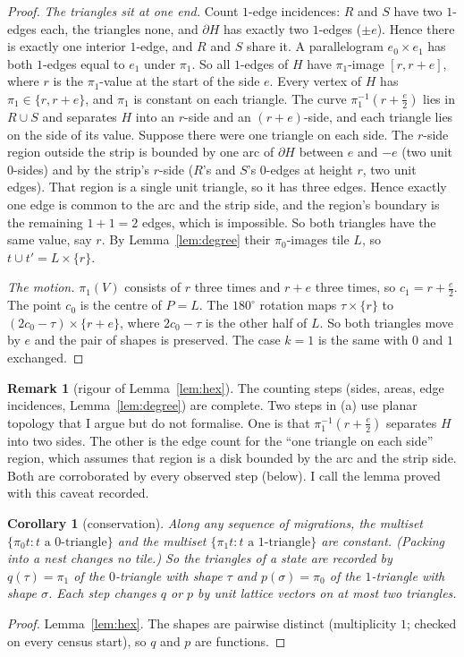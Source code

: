 \documentclass[11pt]{article}
\newtheorem{corollary}[theorem]{Corollary}
\theoremstyle{definition}
\newtheorem{remark}[theorem]{Remark}
\begin{document}
\begin{proof}
\emph{The triangles sit at one end.} Count $1$-edge incidences: $R$ and $S$ have two $1$-edges each, the triangles none, and $\partial H$ has
exactly two $1$-edges ($\pm e$). Hence there is exactly one interior $1$-edge, and $R$ and $S$ share it. A parallelogram $e_0\times e_1$ has both
$1$-edges equal to $e_1$ under $\pi_1$. So all $1$-edges of $H$ have $\pi_1$-image $[r,r+e]$, where $r$ is the $\pi_1$-value at the start of the
side $e$. Every vertex of $H$ has $\pi_1\in\{r,r+e\}$, and $\pi_1$ is constant on each triangle. The curve $\pi_1^{-1}(r+\frac e2)$ lies in
$R\cup S$ and separates $H$ into an $r$-side and an $(r+e)$-side, and each triangle lies on the side of its value. Suppose there were one triangle on
each side. The $r$-side region outside the strip is bounded by one arc of $\partial H$ between $e$ and $-e$ (two unit $0$-sides) and by the
strip's $r$-side ($R$'s and $S$'s $0$-edges at height $r$, two unit edges). That region is a single unit triangle, so it has three edges. Hence
exactly one edge is common to the arc and the strip side, and the region's boundary is the remaining $1+1=2$ edges, which is impossible.
So both triangles have the same value, say $r$. By Lemma~\ref{lem:degree} their $\pi_0$-images tile $L$, so $t\cup t'=L\times\{r\}$.

\emph{The motion.} $\pi_1(V)$ consists of $r$ three times and $r+e$ three times, so $c_1=r+\frac e2$. The point $c_0$ is the centre of $P=L$. The
$180^\circ$ rotation maps $\tau\times\{r\}$ to $(2c_0-\tau)\times\{r+e\}$, where $2c_0-\tau$ is the other half of $L$. So both triangles
move by $e$ and the pair of shapes is preserved. The case $k=1$ is the same with $0$ and $1$ exchanged.
\end{proof}

\begin{remark}[rigour of Lemma~\ref{lem:hex}]
The counting steps (sides, areas, edge incidences, Lemma~\ref{lem:degree}) are complete. Two steps in (a) use planar topology that I
argue but do not formalise. One is that $\pi_1^{-1}(r+\frac e2)$ separates $H$ into two sides. The other is the edge count for the
``one triangle on each side'' region, which assumes that region is a disk bounded by the arc and the strip side. Both are corroborated
by every observed step (below). I call the lemma proved with this caveat recorded.
\end{remark}

\begin{corollary}[conservation]\label{cor:cons}
Along any sequence of migrations, the multiset $\{\pi_0 t: t\text{ a }0\text{-triangle}\}$ and the multiset $\{\pi_1 t: t\text{ a }1\text{-triangle}\}$ are
constant. (Packing into a nest changes no tile.) So the triangles of a state are recorded by $q(\tau)=\pi_1$ of the $0$-triangle with shape $\tau$ and
$p(\sigma)=\pi_0$ of the $1$-triangle with shape $\sigma$. Each step changes $q$ or $p$ by unit lattice vectors on at most two triangles.
\end{corollary}
\begin{proof}
Lemma~\ref{lem:hex}. The shapes are pairwise distinct (multiplicity $1$; checked on every census start), so $q$ and $p$ are functions.
\end{proof}
\end{document}
